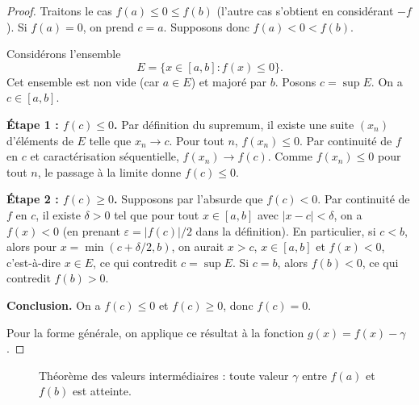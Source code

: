 \documentclass[12pt,a4paper,openany]{book}
\theoremstyle{definition}
\begin{document}
\begin{proof}
Traitons le cas $f(a) \leqslant 0 \leqslant f(b)$ (l'autre cas s'obtient en considérant $-f$). Si $f(a) = 0$, on prend $c = a$. Supposons donc $f(a) < 0 < f(b)$.

Considérons l'ensemble
\[
  E = \{x \in [a, b] : f(x) \leqslant 0\}.
\]
Cet ensemble est non vide (car $a \in E$) et majoré par $b$. Posons $c = \sup E$. On a $c \in [a, b]$.

\medskip
\textbf{Étape 1 : $f(c) \leqslant 0$.} Par définition du supremum, il existe une suite $(x_n)$ d'éléments de $E$ telle que $x_n \to c$. Pour tout $n$, $f(x_n) \leqslant 0$. Par continuité de $f$ en $c$ et caractérisation séquentielle, $f(x_n) \to f(c)$. Comme $f(x_n) \leqslant 0$ pour tout $n$, le passage à la limite donne $f(c) \leqslant 0$.

\medskip
\textbf{Étape 2 : $f(c) \geqslant 0$.} Supposons par l'absurde que $f(c) < 0$. Par continuité de $f$ en $c$, il existe $\delta > 0$ tel que pour tout $x \in [a, b]$ avec $|x - c| < \delta$, on a $f(x) < 0$ (en prenant $\varepsilon = |f(c)|/2$ dans la définition). En particulier, si $c < b$, alors pour $x = \min(c + \delta/2, b)$, on aurait $x > c$, $x \in [a, b]$ et $f(x) < 0$, c'est-à-dire $x \in E$, ce qui contredit $c = \sup E$. Si $c = b$, alors $f(b) < 0$, ce qui contredit $f(b) > 0$.

\medskip
\textbf{Conclusion.} On a $f(c) \leqslant 0$ et $f(c) \geqslant 0$, donc $f(c) = 0$.

Pour la forme générale, on applique ce résultat à la fonction $g(x) = f(x) - \gamma$.
\end{proof}

\begin{figure}[ht]
\centering
{}
\caption{Théorème des valeurs intermédiaires : toute valeur $\gamma$ entre $f(a)$ et $f(b)$ est atteinte.}
\label{fig:TVI}
\end{figure}
\end{document}
